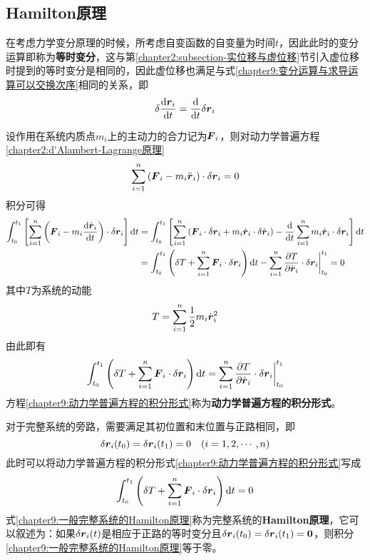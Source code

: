 \subsection{Hamilton原理}

在考虑力学变分原理的时候，所考虑自变函数的自变量为时间$t$，因此此时的变分运算即称为{\bf 等时变分}，这与第\ref{chapter2:subsection-实位移与虚位移}节引入虚位移时提到的等时变分是相同的，因此虚位移也满足与式\eqref{chapter9:变分运算与求导运算可以交换次序}相同的关系，即
\begin{equation}
	\delta \dfrac{\mathrm{d} \boldsymbol{r}_i}{\mathrm{d} t} = \dfrac{\mathrm{d}}{\mathrm{d} t} \delta\boldsymbol{r}_i
\end{equation}

设作用在系统内质点$m_i$上的主动力的合力记为$\boldsymbol{F}_i$，则对动力学普遍方程\eqref{chapter2:d'Alambert-Lagrange原理}
\begin{equation}
	\sum_{i=1}^n \left(\boldsymbol{F}_i-m_i\ddot{\boldsymbol{r}}_i\right)\cdot \delta \boldsymbol{r}_i = 0
	\label{chapter9:d'Alambert-Lagrange原理-重写}
\end{equation}
积分可得
\begin{align*}
	\int_{t_0}^{t_1} \left[\sum_{i=1}^n \left(\boldsymbol{F}_i - m_i \frac{\mathrm{d} \dot{\boldsymbol{r}}_i}{\mathrm{d} t}\right) \cdot \delta \boldsymbol{r}_i\right]\mathrm{d} t & = \int_{t_0}^{t_1} \left[\sum_{i=1}^n \left(\boldsymbol{F}_i \cdot \delta \boldsymbol{r}_i + m_i \dot{\boldsymbol{r}}_i \cdot \delta \dot{\boldsymbol{r}}_i\right) - \frac{\mathrm{d}}{\mathrm{d} t} \sum_{i=1}^n m_i \dot{\boldsymbol{r}}_i \cdot \delta \boldsymbol{r}_i\right]\mathrm{d} t \\
	& = \int_{t_0}^{t_1} \left(\delta T + \sum_{i=1}^n \boldsymbol{F}_i \cdot \delta \boldsymbol{r}_i\right)\mathrm{d} t - \sum_{i=1}^n \frac{\partial T}{\partial \dot{\boldsymbol{r}}_i} \cdot \delta \boldsymbol{r}_i\bigg|_{t_0}^{t_1} = 0
\end{align*}
其中$T$为系统的动能
\begin{equation}
	T = \sum_{i=1}^n \frac12 m_i\dot{\boldsymbol{r}}_i^2
\end{equation}
由此即有
\begin{equation}
	\int_{t_0}^{t_1} \left(\delta T + \sum_{i=1}^n \boldsymbol{F}_i \cdot \delta \boldsymbol{r}_i\right) \mathrm{d} t = \sum_{i=1}^n \frac{\partial T}{\partial \dot{\boldsymbol{r}}_i} \cdot \delta \boldsymbol{r}_i \bigg|_{t_0}^{t_1}
	\label{chapter9:动力学普遍方程的积分形式}
\end{equation}
方程\eqref{chapter9:动力学普遍方程的积分形式}称为{\bf 动力学普遍方程的积分形式}。

对于完整系统的旁路，需要满足其初位置和末位置与正路相同，即
\begin{equation*}
	\delta \boldsymbol{r}_i(t_0) = \delta \boldsymbol{r}_i(t_1) = 0 \quad (i = 1,2,\cdots,n)
\end{equation*}
此时可以将动力学普遍方程的积分形式\eqref{chapter9:动力学普遍方程的积分形式}写成
\begin{equation}
	\int_{t_0}^{t_1} \left(\delta T + \sum_{i=1}^n \boldsymbol{F}_i \cdot \delta \boldsymbol{r}_i\right) \mathrm{d} t = 0
	\label{chapter9:一般完整系统的Hamilton原理}
\end{equation}
式\eqref{chapter9:一般完整系统的Hamilton原理}称为完整系统的{\bf Hamilton原理}，它可以叙述为：如果$\delta \boldsymbol{r}_i(t)$是相应于正路的等时变分且$\delta\boldsymbol{r}_i(t_0)=\delta\boldsymbol{r}_i(t_1)=\boldsymbol{0}$，则积分\eqref{chapter9:一般完整系统的Hamilton原理}等于零。

